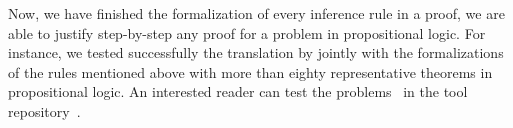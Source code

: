 \documentclass[../main.tex]{subfiles}
\begin{document}










Now, we have finished the formalization of every inference rule in
a \Metis proof, we are able to justify step-by-step any proof
for a problem in propositional logic.
For instance, we tested successfully the translation by \Athena jointly with
the \Agda formalizations of the rules mentioned above with more than eighty
representative theorems in propositional logic. An interested reader can test
the problems~\cite{Prieto-Cubides2017} in the \Athena tool
repository~\cite{Athena}.
\end{document}
